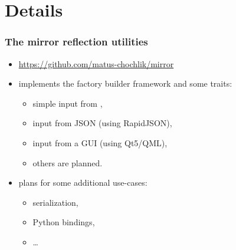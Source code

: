 \documentclass[compress,table,xcolor=table]{beamer}
\begin{document}
\section{Details}
\begin{frame}[fragile]
\frametitle{The mirror reflection utilities}
	\Large
	\begin{itemize}
		\item \url{https://github.com/matus-chochlik/mirror}
		\item implements the factory builder framework and some traits:
		\begin{itemize}
			\large
			\item simple input from \verb@iostreams@,
			\item input from JSON (using RapidJSON),
			\item input from a GUI (using Qt5/QML),
			\item others are planned.
		\end{itemize}
		\item plans for some additional use-cases:
		\begin{itemize}
			\large
			\item serialization,
			\item Python bindings,
			\item \ldots
		\end{itemize}
	\end{itemize}
\end{frame}
\end{document}
